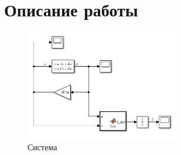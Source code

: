 \documentclass[14pt, a4paper]{extarticle}
\begin{document}
	\newpage
	
	\section*{Описание работы}
	
	\begin{figure}[h] \label{fig:system}
		\centering
		\includegraphics[width=0.6\textwidth]{system}
		\caption{Система}
	\end{figure}
\end{document}
